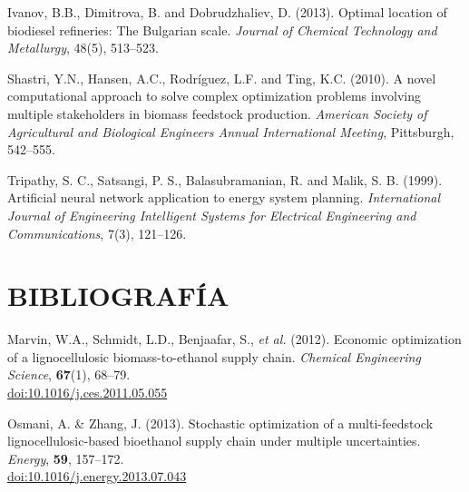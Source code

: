 \documentclass[12pt]{article}
\begin{document}
\begin{thebibliography}{10}
Ivanov, B.B., Dimitrova, B. and Dobrudzhaliev, D. (2013). 
Optimal location of biodiesel refineries: The Bulgarian scale. 
\textit{Journal of Chemical Technology and Metallurgy}, 48(5), 513--523.

Shastri, Y.N., Hansen, A.C., Rodríguez, L.F. and Ting, K.C. (2010). 
A novel computational approach to solve complex optimization problems involving multiple stakeholders in biomass feedstock production. 
\textit{American Society of Agricultural and Biological Engineers Annual International Meeting}, Pittsburgh, 542--555.

Tripathy, S. C., Satsangi, P. S., Balasubramanian, R. and Malik, S. B. (1999). 
Artificial neural network application to energy system planning. 
\textit{International Journal of Engineering Intelligent Systems for Electrical Engineering and Communications}, 7(3), 121--126.

\end{thebibliography}



\section*{BIBLIOGRAFÍA}

\begin{thebibliography}{10}
\setlength{\itemsep}{-0.2cm} %

Marvin, W.A., Schmidt, L.D., Benjaafar, S., \textit{et al.} (2012). 
Economic optimization of a lignocellulosic biomass-to-ethanol supply chain. 
\textit{Chemical Engineering Science}, \textbf{67}(1), 68--79. \\
\href{https://doi.org/10.1016/j.ces.2011.05.055}{doi:10.1016/j.ces.2011.05.055}

Osmani, A. \& Zhang, J. (2013). 
Stochastic optimization of a multi-feedstock lignocellulosic-based bioethanol supply chain under multiple uncertainties. 
\textit{Energy}, \textbf{59}, 157--172. \\
\href{https://doi.org/10.1016/j.energy.2013.07.043}{doi:10.1016/j.energy.2013.07.043}

\end{thebibliography}

\clearpage
\end{document}
